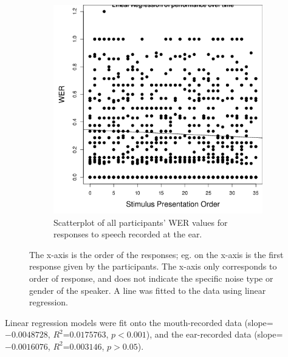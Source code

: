 \begin{figure}[ht]
\begin{subfigure}{0.47\textwidth}
\includegraphics[width=\maxwidth]{figure/line_graph_chrono-1} 

\caption{Scatterplot of all participants' WER values for responses to speech recorded at the ear.}
\label{fig:linear_performance_e}
\end{subfigure}
\caption{The x-axis is the order of the responses; eg. \DIFdelbeginFL {}\DIFdelendFL \DIFaddbeginFL {} \DIFdelbeginFL {}\DIFdelendFL on the x-axis is the first response given by the participants.  The x-axis only corresponds to order of response, and does not indicate the specific noise type or gender of the speaker.  A line was fitted to the data using linear regression.}
\end{figure}
%
Linear regression models were fit onto the mouth-recorded data (slope=$-0.0048728$, $R^2$=$0.0175763$, $p<0.001$), and the ear-recorded data (slope=$-0.0016076$, $R^2$=$0.003146$, $p>0.05$). 

